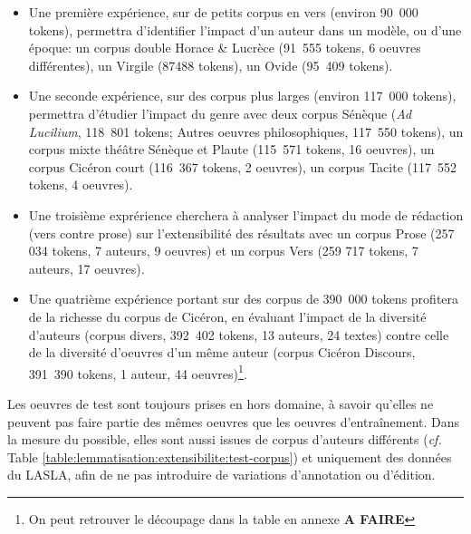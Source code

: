 \begin{itemize}
    \item Une première expérience, sur de petits corpus en vers (environ 90~000 tokens), permettra d'identifier l'impact d'un auteur dans un modèle, ou d'une époque: un corpus double Horace \& Lucrèce (91~555 tokens, 6 oeuvres différentes), un Virgile (87488 tokens), un Ovide (95~409 tokens).
    \item Une seconde expérience, sur des corpus plus larges (environ 117~000 tokens), permettra d'étudier l'impact du genre avec deux corpus Sénèque (\textit{Ad Lucilium}, 118~801 tokens; Autres oeuvres philosophiques, 117~550 tokens), un corpus mixte théâtre Sénèque et Plaute (115~571 tokens, 16 oeuvres), un corpus Cicéron court (116~367 tokens, 2 oeuvres), un corpus Tacite (117~552 tokens, 4 oeuvres).
    \item Une troisième exprérience cherchera à analyser l'impact du mode de rédaction (vers contre prose) sur l'extensibilité des résultats avec un corpus Prose (257 034 tokens, 7 auteurs, 9 oeuvres) et un corpus Vers (259 717 tokens, 7 auteurs, 17 oeuvres).
    \item Une quatrième expérience portant sur des corpus de 390~000 tokens profitera de la richesse du corpus de Cicéron, en évaluant l'impact de la diversité d'auteurs (corpus divers, 392~402 tokens, 13 auteurs, 24 textes) contre celle de la diversité d'oeuvres d'un même auteur (corpus Cicéron Discours, 391~390 tokens, 1 auteur, 44 oeuvres)\footnote{On peut retrouver le découpage dans la table en annexe \textbf{A FAIRE}}.
\end{itemize}{}

Les oeuvres de test sont toujours prises en hors domaine, à savoir qu'elles ne peuvent pas faire partie des mêmes oeuvres que les oeuvres d'entraînement. Dans la mesure du possible, elles sont aussi issues de corpus d'auteurs différents (\textit{cf.} Table \ref{table:lemmatisation:extensibilite:test-corpus}) et uniquement des données du LASLA, afin de ne pas introduire de variations d'annotation ou d'édition.

